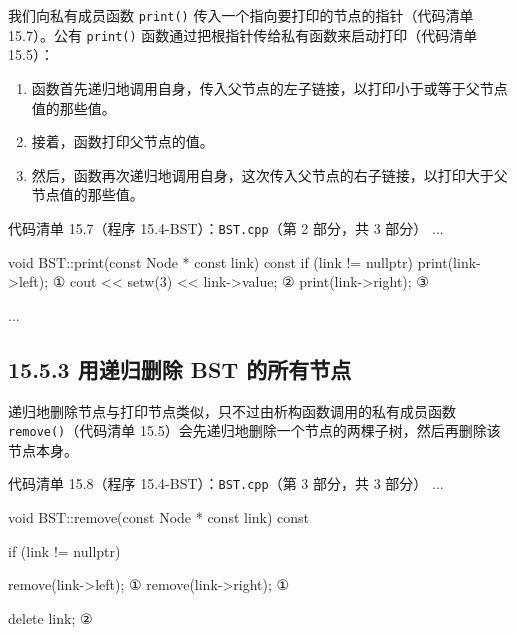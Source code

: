 我们向私有成员函数 \texttt{print()} 传入一个指向要打印的节点的指针（代码清单 15.7）。公有 \texttt{print()} 函数通过把根指针传给私有函数来启动打印（代码清单 15.5）：

\begin{enumerate}
\item 函数首先递归地调用自身，传入父节点的左子链接，以打印小于或等于父节点值的那些值。
\item 接着，函数打印父节点的值。
\item 然后，函数再次递归地调用自身，这次传入父节点的右子链接，以打印大于父节点值的那些值。
\end{enumerate}

\begin{codeboxt}{代码清单 15.7（程序 15.4-BST）：\texttt{BST.cpp}（第 2 部分，共 3 部分）}
...

void BST::print(const Node * const link) const
{
    if (link != nullptr)
    {
        print(link->left);                 ①
        cout << setw(3) << link->value;    ②
        print(link->right);                ③
    }
}

...
\end{codeboxt}
\par
{}\par
{}\par

\subsection{15.5.3 用递归删除 BST 的所有节点}

递归地删除节点与打印节点类似，只不过由析构函数调用的私有成员函数 \texttt{remove()}（代码清单 15.5）会先递归地删除一个节点的两棵子树，然后再删除该节点本身。

\begin{codeboxt}{代码清单 15.8（程序 15.4-BST）：\texttt{BST.cpp}（第 3 部分，共 3 部分）}
...

void BST::remove(const Node * const link) const
{
    if (link != nullptr)
    {
        remove(link->left);                 ①
        remove(link->right);                ①

        delete link;                        ②
    }
}
\end{codeboxt}
\par
{}\par

